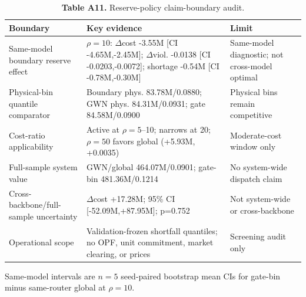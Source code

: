 \begin{table}[H]
\centering
\scriptsize
\setlength{\tabcolsep}{2.4pt}
\renewcommand{\arraystretch}{1.03}
\caption*{\textbf{Table A11.} Reserve-policy claim-boundary audit.}
\begin{tabularx}{\columnwidth}{>{\raggedright\arraybackslash}p{} >{\raggedright\arraybackslash}X >{\raggedright\arraybackslash}p{}}
\toprule
Boundary & Key evidence & Limit \\
\midrule
Same-model boundary reserve effect & $\rho=10$: $\Delta$cost -3.55M [CI -4.65M,-2.45M]; $\Delta$viol. -0.0138 [CI -0.0203,-0.0072]; shortage -0.54M [CI -0.78M,-0.30M] & Same-model diagnostic; not cross-model optimal \\
Physical-bin quantile comparator & Boundary phys. 83.78M/0.0880; GWN phys. 84.31M/0.0931; gate 84.58M/0.0900 & Physical bins remain competitive \\
Cost-ratio applicability & Active at $\rho=5$--10; narrows at 20; $\rho=50$ favors global (+5.93M, +0.0035) & Moderate-cost window only \\
Full-sample system value & GWN/global 464.07M/0.0901; gate-bin 481.36M/0.1214 & No system-wide dispatch claim \\
Cross-backbone/full-sample uncertainty & $\Delta$cost +17.28M; 95\% CI [-52.09M,+87.95M]; p=0.752 & Not system-wide or cross-backbone \\
Operational scope & Validation-frozen shortfall quantiles; no OPF, unit commitment, market clearing, or prices & Screening audit only \\
\bottomrule
\end{tabularx}
\vspace{1mm}
\footnotesize Same-model intervals are $n=5$ seed-paired bootstrap mean CIs for gate-bin minus same-router global at $\rho=10$.
\end{table}
